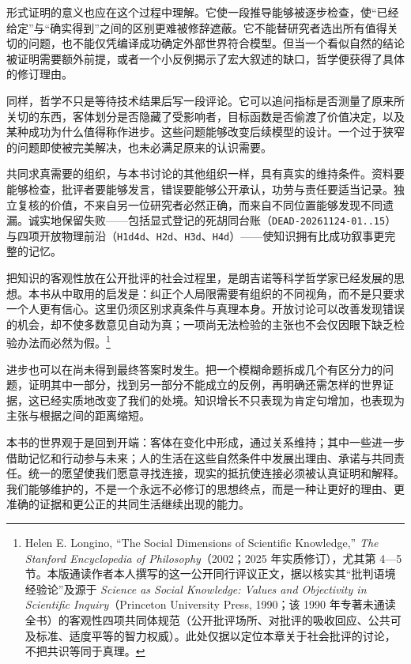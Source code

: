 \documentclass[
  11pt,
  oneside]{book}
\begin{document}
形式证明的意义也应在这个过程中理解。它使一段推导能够被逐步检查，使``已经给定''与``确实得到''之间的区别更难被修辞遮蔽。它不能替研究者选出所有值得关切的问题，也不能仅凭编译成功确定外部世界符合模型。但当一个看似自然的结论被证明需要额外前提，或者一个小反例揭示了宏大叙述的缺口，哲学便获得了具体的修订理由。

同样，哲学不只是等待技术结果后写一段评论。它可以追问指标是否测量了原来所关切的东西，客体划分是否隐藏了受影响者，目标函数是否偷渡了价值决定，以及某种成功为什么值得称作进步。这些问题能够改变后续模型的设计。一个过于狭窄的问题即使被完美解决，也未必满足原来的认识需要。

共同求真需要的组织，与本书讨论的其他组织一样，具有真实的维持条件。资料要能够检查，批评者要能够发言，错误要能够公开承认，功劳与责任要适当记录。独立复核的价值，不来自另一位研究者必然正确，而来自不同位置能够发现不同遗漏。诚实地保留失败------包括显式登记的死胡同台账（\texttt{DEAD-20261124-01..15}）与四项开放物理前沿（\texttt{H1d4d}、\texttt{H2d}、\texttt{H3d}、\texttt{H4d}）------使知识拥有比成功叙事更完整的记忆。

把知识的客观性放在公开批评的社会过程里，是朗吉诺等科学哲学家已经发展的思想。本书从中取用的启发是：纠正个人局限需要有组织的不同视角，而不是只要求一个人更有信心。这里仍须区别求真条件与真理本身。开放讨论可以改善发现错误的机会，却不使多数意见自动为真；一项尚无法检验的主张也不会仅因眼下缺乏检验办法而必然为假。\footnote{\hypertarget{ph-note-68}{}Helen E. Longino, ``The Social Dimensions of Scientific Knowledge,'' \emph{The Stanford Encyclopedia of Philosophy}（2002；2025 年实质修订），尤其第 4---5 节。本版通读作者本人撰写的这一公开同行评议正文，据以核实其``批判语境经验论''及源于 \emph{Science as Social Knowledge: Values and Objectivity in Scientific Inquiry}（Princeton University Press, 1990；该 1990 年专著未通读全书）的客观性四项共同体规范（公开批评场所、对批评的吸收回应、公共可及标准、适度平等的智力权威）。此处仅据以定位本章关于社会批评的讨论，不把共识等同于真理。}

进步也可以在尚未得到最终答案时发生。把一个模糊命题拆成几个有区分力的问题，证明其中一部分，找到另一部分不能成立的反例，再明确还需怎样的世界证据，这已经实质地改变了我们的处境。知识增长不只表现为肯定句增加，也表现为主张与根据之间的距离缩短。

\begingroup{}

本书的世界观于是回到开端：客体在变化中形成，通过关系维持；其中一些进一步借助记忆和行动参与未来；人的生活在这些自然条件中发展出理由、承诺与共同责任。统一的愿望使我们愿意寻找连接，现实的抵抗使连接必须被认真证明和解释。我们能够维护的，不是一个永远不必修订的思想终点，而是一种让更好的理由、更准确的证据和更公正的共同生活继续出现的能力。
\end{document}
